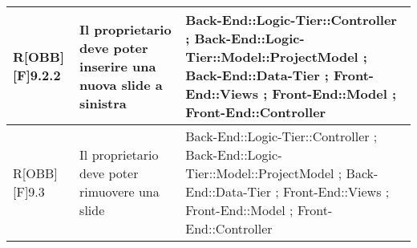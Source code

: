 \begin{table}[h]
\begin{tabular}{|p{}|p{}|p{}|}
				R[OBB][F]9.2.2 & Il proprietario deve poter inserire una nuova slide a sinistra & Back-End::Logic-Tier::Controller ; Back-End::Logic-Tier::Model::ProjectModel ; Back-End::Data-Tier ; Front-End::Views ; Front-End::Model ; Front-End::Controller \\ \midrule
				R[OBB][F]9.3 & Il proprietario deve poter rimuovere una slide & Back-End::Logic-Tier::Controller ; Back-End::Logic-Tier::Model::ProjectModel ; Back-End::Data-Tier ; Front-End::Views ; Front-End::Model ; Front-End::Controller \\ \midrule

		\end{tabular}
	\end{table}
	\newpage
	
	\begin{table}[h]
		\begin{tabular}{|p{}|p{}|p{}|}
			\midrule
			

\end{tabular}
\end{table}
